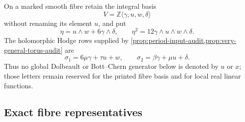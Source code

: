 On a marked smooth fibre retain the integral basis
\[
 V=\mathbb Z\langle\gamma,u,w,\delta\rangle
\]
without renaming its element $u$, and put
\begin{equation}
 \eta=u\wedge w+6\gamma\wedge\delta,
 \qquad
 \eta^2=12\gamma\wedge u\wedge w\wedge\delta.
\label{eq:bcpr-eta-square}
\end{equation}
The holomorphic Hodge rows supplied by
\cref{prop:period-input-audit,prop:very-general-torus-audit} are
\begin{equation}
 \sigma_1=6\mu\gamma+\tau u+w,
 \qquad
 \sigma_2=\beta\gamma+\mu u+\delta.
\label{eq:bcpr-period-rows}
\end{equation}
Thus no global Dolbeault or Bott--Chern generator below is denoted by
$u$ or $x$; those letters remain reserved for the printed fibre basis and
for local real linear functions.

\subsection{Exact fibre representatives}

